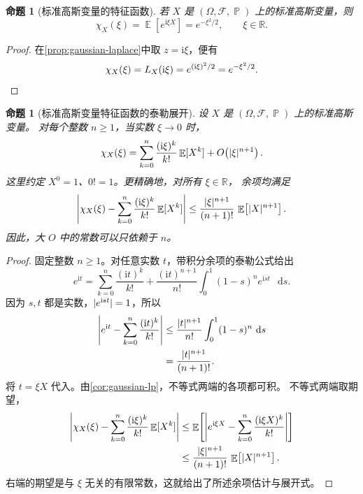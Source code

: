 \documentclass[UTF8,11pt,a4paper,oneside,fontset=fandol]{ctexrep}
\numberwithin{equation}{section}
\theoremstyle{plain}
\newtheorem{proposition}[theorem]{命题}
\theoremstyle{definition}
\theoremstyle{remark}
\newcommand{\R}{\mathbb{R}}
\newcommand{\F}{\mathcal{F}}
\DeclareMathOperator{\Prob}{\mathbb{P}}
\DeclareMathOperator{\E}{\mathbb{E}}
\newcommand{\dd}{\mathop{}\!\mathrm{d}}
\DeclarePairedDelimiter{\abs}{\lvert}{\rvert}
\begin{document}
\begin{samepage}
\begin{proposition}[标准高斯变量的特征函数]
\label{prop:gaussian-characteristic}
若 $X$ 是 $(\Omega,\F,\Prob)$ 上的标准高斯变量，则
\begin{equation}
  \label{eq:gaussian-characteristic}
  \chi_X(\xi)=\E\!\left[e^{\mathrm{i}\xi X}\right]
  =e^{-\xi^2/2},
  \qquad \xi\in\R.
\end{equation}
\end{proposition}

\begin{proof}
在\cref{prop:gaussian-laplace}中取 $z=\mathrm{i}\xi$，便有
\[
  \chi_X(\xi)
  =L_X(\mathrm{i}\xi)
  =e^{(\mathrm{i}\xi)^2/2}
  =e^{-\xi^2/2}.\qedhere
\]
\end{proof}
\end{samepage}

\begin{proposition}[标准高斯变量特征函数的泰勒展开]
\label{prop:gaussian-taylor}
设 $X$ 是 $(\Omega,\F,\Prob)$ 上的标准高斯变量。
对每个整数 $n\ge1$，当实数 $\xi\to0$ 时，
\begin{equation}
  \label{eq:gaussian-taylor}
  \chi_X(\xi)
  =\sum_{k=0}^{n}\frac{(\mathrm{i}\xi)^k}{k!}\E[X^k]
   +O\!\left(\abs{\xi}^{n+1}\right).
\end{equation}
这里约定 $X^0=1$、$0!=1$。更精确地，对所有 $\xi\in\R$，
余项均满足
\[
  \abs*{\chi_X(\xi)
       -\sum_{k=0}^{n}\frac{(\mathrm{i}\xi)^k}{k!}\E[X^k]}
  \le \frac{\abs{\xi}^{n+1}}{(n+1)!}\,
       \E\!\left[\abs{X}^{n+1}\right].
\]
因此，大 $O$ 中的常数可以只依赖于 $n$。
\end{proposition}

\begin{proof}
固定整数 $n\ge1$。对任意实数 $t$，带积分余项的泰勒公式给出
\[
  e^{\mathrm{i}t}
  =\sum_{k=0}^{n}\frac{(\mathrm{i}t)^k}{k!}
   +\frac{(\mathrm{i}t)^{n+1}}{n!}
      \int_0^1(1-s)^n e^{\mathrm{i}st}\,\dd s.
\]
因为 $s,t$ 都是实数，$\abs{e^{\mathrm{i}st}}=1$，所以
\begin{align*}
  \abs*{e^{\mathrm{i}t}
        -\sum_{k=0}^{n}\frac{(\mathrm{i}t)^k}{k!}}
  &\le \frac{\abs{t}^{n+1}}{n!}\int_0^1(1-s)^n\,\dd s\\
  &=\frac{\abs{t}^{n+1}}{(n+1)!}.
\end{align*}
将 $t=\xi X$ 代入。由\cref{cor:gaussian-lp}，不等式两端的各项都可积。
不等式两端取期望，
\begin{align*}
  \abs*{\chi_X(\xi)
        -\sum_{k=0}^{n}\frac{(\mathrm{i}\xi)^k}{k!}\E[X^k]}
  &\le \E\!\left[
    \abs*{e^{\mathrm{i}\xi X}
          -\sum_{k=0}^{n}\frac{(\mathrm{i}\xi X)^k}{k!}}
  \right]\\
  &\le \frac{\abs{\xi}^{n+1}}{(n+1)!}\,
         \E\!\left[\abs{X}^{n+1}\right].
\end{align*}
右端的期望是与 $\xi$ 无关的有限常数，这就给出了所述余项估计与展开式。
\end{proof}
\end{document}
